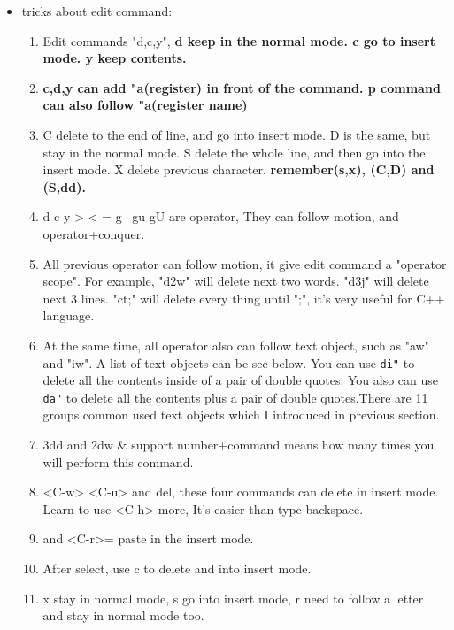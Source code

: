 \documentclass[a4paper,11pt,twoside]{book}
\begin{document}
\begin{itemize}
\item tricks about edit command: 
		\begin{enumerate} 
				\item  Edit commands "d,c,y", \textbf{d keep in the normal mode. c go to insert mode. y keep contents.} 

				\item \textbf{c,d,y can add "a(register) in front of the command. p command can also follow "a(register name)}

				\item C delete to the end of line, and go into insert mode. D is the same, but stay in the normal mode. S delete the whole line, and then go into the insert mode. X delete previous character. \textbf{remember(s,x), (C,D) and (S,dd).}
						
				\item d c y > < = g~ gu gU are operator, They can follow motion, and operator+conquer.

				\item All previous operator can follow motion, it give edit command a "operator scope". For example, "d2w" will delete next two words. "d3j" will delete next 3 lines. "ct;" will delete every thing until ";", it's very useful for C++ language. 

				\item  At the same time, all operator also can follow text object, such as "aw" and "iw". A list of text objects can be see below.  You can use \verb=di"= to delete all the contents inside of a pair of double quotes. You also can use \verb=da"= to delete all the contents plus a pair of double quotes.There are 11 groups common used text objects which I introduced in previous section. 


				\item 3dd and 2dw   \& support number+command means how many times you will perform this command.

				\item <C-h> <C-w> <C-u> and del, these four commands can delete in insert mode. Learn to use <C-h> more, It's easier than type backspace.
					
				\item <C-r> and <C-r>= paste in the insert mode.

				\item After select, use c to delete and into insert mode.

				\item x stay in normal mode, s go into insert mode, r need to follow a letter and stay in normal mode too.
						

\end{enumerate}
\end{itemize}
\end{document}
